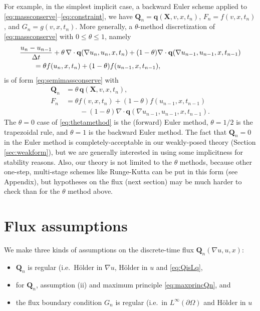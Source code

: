 \documentclass[final,leqno,onefignum,onetabnum]{siamltex1213bueler}
\newcommand\bq{\mathbf{q}}
\newcommand\bQ{\mathbf{Q}}
\newcommand\bX{\mathbf{X}}
\newcommand{\Div}{\nabla\cdot}
\renewcommand{\grad}{\nabla}
\begin{document}
For example, in the simplest implicit case, a backward Euler scheme applied to \eqref{eq:massconserve}--\eqref{eq:constraint}, we have $\bQ_n = \bq(\bX,v,x,t_n)$, $F_n = f(v,x,t_n)$, and $G_n = g(v,x,t_n)$.  More generally, a $\theta$-method discretization of \eqref{eq:massconserve} with $0\le \theta \le 1$, namely
\begin{align}
  &\frac{u_n - u_{n-1}}{\Delta t} + \theta\, \Div \bq(\grad u_n,u_n,x,t_n) + (1-\theta) \Div \bq(\grad u_{n-1},u_{n-1},x,t_{n-1}) \label{eq:thetamethod} \\
  &\qquad =  \theta f(u_n,x,t_n) + (1-\theta) f(u_{n-1},x,t_{n-1}), \notag
\end{align}
is of form \eqref{eq:semimassconserve} with
\begin{align*}
\bQ_n &= \theta\, \bq(\bX,v,x,t_n), \\
F_n   &= \theta f(v,x,t_n) + (1-\theta) f(u_{n-1},x,t_{n-1}) \\
               &\qquad - (1-\theta) \Div \bq(\grad u_{n-1},u_{n-1},x,t_{n-1}).
\end{align*}
The $\theta=0$ case of \eqref{eq:thetamethod} is the (forward) Euler method, $\theta=1/2$ is the trapezoidal rule, and $\theta=1$ is the backward Euler method.  The fact that $\bQ_n=0$ in the Euler method is completely-acceptable in our weakly-posed theory (Section \ref{sec:weakform}), but we are generally interested in using some implicitness for stability reasons.  Also, our theory is not limited to the $\theta$ methods, because other one-step, multi-stage schemes like Runge-Kutta can be put in this form (see Appendix), but hypotheses on the flux (next section) may be much harder to check than for the $\theta$ method above.


\section{Flux assumptions} \label{sec:fluxassumptions}

We make three kinds of assumptions on the discrete-time flux $\bQ_n(\grad u,u,x)$: \begin{itemize}
\item $\bQ_n$ is regular (i.e.~H\"older in $\grad u$, H\"older in $u$ and \eqref{eq:QisLq},
\item for $\bQ_n$, assumption (ii) and maximum principle \eqref{eq:maxprincQn}, and
\item the flux boundary condition $G_n$ is regular (i.e.~in $L^\infty(\partial\Omega)$ and H\"older in $u$
\end{itemize}
\end{document}
